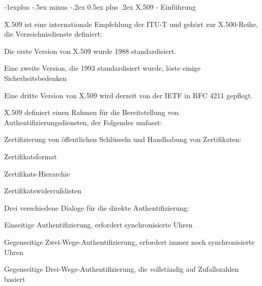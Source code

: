 \documentclass[a4paper]{article}
\makeatletter
\renewcommand{\subsection}{\@startsection{subsection}{2}{0mm}%
 {-1explus -.5ex minus -.2ex}%
 {0.5ex plus .2ex}%
 {\normalfont\normalsize\bfseries}}
\makeatother
\begin{document}
\begin{multicols}{3}
      \subsection{X.509 - Einführung}
      \begin{itemize*}
            \item X.509 ist eine internationale Empfehlung der ITU-T und gehört zur X.500-Reihe, die Verzeichnisdienste definiert:
            \begin{itemize*}
                  \item Die erste Version von X.509 wurde 1988 standardisiert.
                  \item Eine zweite Version, die 1993 standardisiert wurde, löste einige Sicherheitsbedenken
                  \item Eine dritte Version von X.509 wird derzeit von der IETF in RFC 4211 gepflegt.
            \end{itemize*}
            \item X.509 definiert einen Rahmen für die Bereitstellung von Authentifizierungsdiensten, der Folgendes umfasst:
            \begin{itemize*}
                  \item Zertifizierung von öffentlichen Schlüsseln und Handhabung von Zertifikaten:
                  \begin{itemize*}
                        \item Zertifikatsformat
                        \item Zertifikats-Hierarchie
                        \item Zertifikatswiderrufslisten
                  \end{itemize*}
                  \item Drei verschiedene Dialoge für die direkte Authentifizierung:
                  \begin{itemize*}
                        \item Einseitige Authentifizierung, erfordert synchronisierte Uhren
                        \item Gegenseitige Zwei-Wege-Authentifizierung, erfordert immer noch synchronisierte Uhren
                        \item Gegenseitige Drei-Wege-Authentifizierung, die vollständig auf Zufallszahlen basiert
                  \end{itemize*}
            \end{itemize*}
      \end{itemize*}


\end{multicols}
\end{document}
